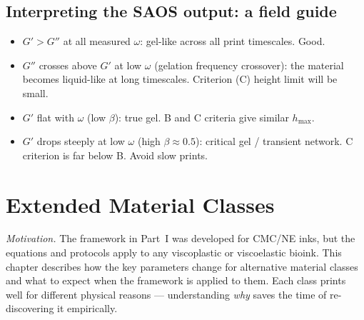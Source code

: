 \documentclass[11pt,a4paper]{article}
\begin{document}
\subsection{Interpreting the SAOS output: a field guide}

\begin{itemize}[leftmargin=1.6em,itemsep=2pt]
\item $G'>G''$ at all measured $\omega$: gel-like across all print
  timescales. Good.
\item $G''$ crosses above $G'$ at low $\omega$ (gelation frequency
  crossover): the material becomes liquid-like at long timescales.
  Criterion (C) height limit will be small.
\item $G'$ flat with $\omega$ (low $\beta$): true gel. B and C
  criteria give similar $h_\mathrm{max}$.
\item $G'$ drops steeply at low $\omega$ (high $\beta\approx 0.5$):
  critical gel / transient network. C criterion is far below B.
  Avoid slow prints.
\end{itemize}

\section{Extended Material Classes}
\label{sec:materials}

\emph{Motivation.} The framework in Part~I was developed for CMC/NE inks, but the equations
and protocols apply to any viscoplastic or viscoelastic bioink. This
chapter describes how the key parameters change for alternative material
classes and what to expect when the framework is applied to them.
Each class prints well for different physical reasons — understanding
\emph{why} saves the time of re-discovering it empirically.
\end{document}
